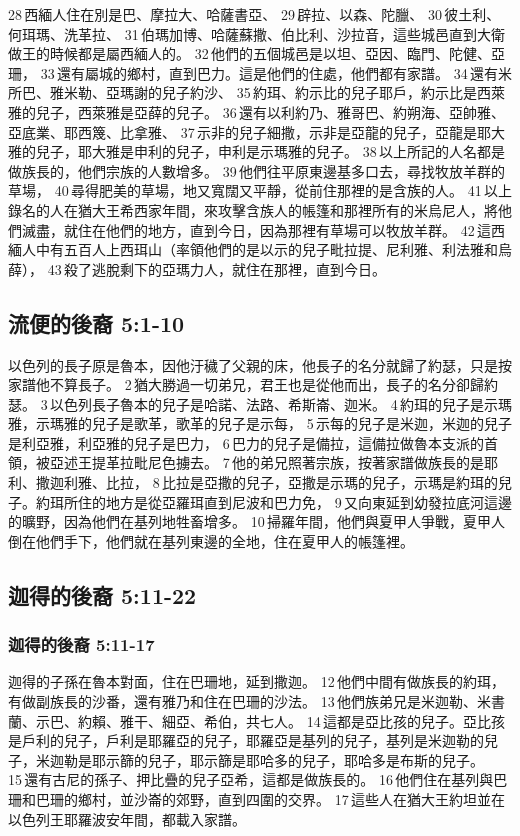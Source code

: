 28 西緬人住在別是巴、摩拉大、哈薩書亞、 29 辟拉、以森、陀臘、 30 彼土利、何珥瑪、洗革拉、 31 伯瑪加博、哈薩蘇撒、伯比利、沙拉音，這些城邑直到大衛做王的時候都是屬西緬人的。 32 他們的五個城邑是以坦、亞因、臨門、陀健、亞珊， 33 還有屬城的鄉村，直到巴力。這是他們的住處，他們都有家譜。 34 還有米所巴、雅米勒、亞瑪謝的兒子約沙、 35 約珥、約示比的兒子耶戶，約示比是西萊雅的兒子，西萊雅是亞薛的兒子。 36 還有以利約乃、雅哥巴、約朔海、亞帥雅、亞底業、耶西篾、比拿雅、 37 示非的兒子細撒，示非是亞龍的兒子，亞龍是耶大雅的兒子，耶大雅是申利的兒子，申利是示瑪雅的兒子。 38 以上所記的人名都是做族長的，他們宗族的人數增多。 39 他們往平原東邊基多口去，尋找牧放羊群的草場， 40 尋得肥美的草場，地又寬闊又平靜，從前住那裡的是含族的人。 41 以上錄名的人在猶大王希西家年間，來攻擊含族人的帳篷和那裡所有的米烏尼人，將他們滅盡，就住在他們的地方，直到今日，因為那裡有草場可以牧放羊群。 42 這西緬人中有五百人上西珥山（率領他們的是以示的兒子毗拉提、尼利雅、利法雅和烏薛）， 43 殺了逃脫剩下的亞瑪力人，就住在那裡，直到今日。

\subsection{流便的後裔 5:1-10}
以色列的長子原是魯本，因他汙穢了父親的床，他長子的名分就歸了約瑟，只是按家譜他不算長子。 2 猶大勝過一切弟兄，君王也是從他而出，長子的名分卻歸約瑟。 3 以色列長子魯本的兒子是哈諾、法路、希斯崙、迦米。 4 約珥的兒子是示瑪雅，示瑪雅的兒子是歌革，歌革的兒子是示每， 5 示每的兒子是米迦，米迦的兒子是利亞雅，利亞雅的兒子是巴力， 6 巴力的兒子是備拉，這備拉做魯本支派的首領，被亞述王提革拉毗尼色擄去。 7 他的弟兄照著宗族，按著家譜做族長的是耶利、撒迦利雅、比拉， 8 比拉是亞撒的兒子，亞撒是示瑪的兒子，示瑪是約珥的兒子。約珥所住的地方是從亞羅珥直到尼波和巴力免， 9 又向東延到幼發拉底河這邊的曠野，因為他們在基列地牲畜增多。 10 掃羅年間，他們與夏甲人爭戰，夏甲人倒在他們手下，他們就在基列東邊的全地，住在夏甲人的帳篷裡。

\subsection{迦得的後裔 5:11-22 }
\subsubsection{迦得的後裔 5:11-17}
迦得的子孫在魯本對面，住在巴珊地，延到撒迦。 12 他們中間有做族長的約珥，有做副族長的沙番，還有雅乃和住在巴珊的沙法。 13 他們族弟兄是米迦勒、米書蘭、示巴、約賴、雅干、細亞、希伯，共七人。 14 這都是亞比孩的兒子。亞比孩是戶利的兒子，戶利是耶羅亞的兒子，耶羅亞是基列的兒子，基列是米迦勒的兒子，米迦勒是耶示篩的兒子，耶示篩是耶哈多的兒子，耶哈多是布斯的兒子。 15 還有古尼的孫子、押比疊的兒子亞希，這都是做族長的。 16 他們住在基列與巴珊和巴珊的鄉村，並沙崙的郊野，直到四圍的交界。 17 這些人在猶大王約坦並在以色列王耶羅波安年間，都載入家譜。

